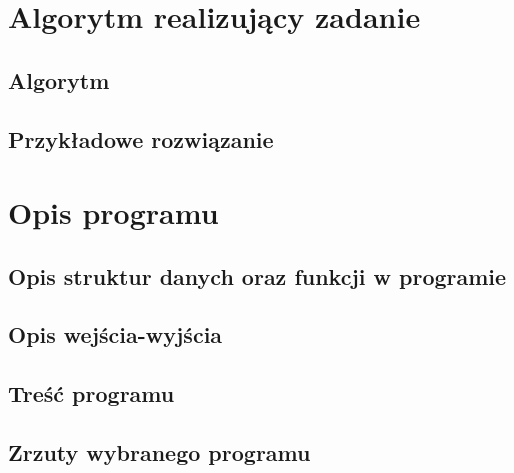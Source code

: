 \documentclass[11pt]{article} %
\begin{document}
\section{Algorytm realizujący zadanie}
\subsection{Algorytm}
\subsection{Przykładowe rozwiązanie}
\section{Opis programu}
\subsection{Opis struktur danych oraz funkcji w programie}
\subsection{Opis wejścia-wyjścia}
\subsection{Treść programu}
\subsection{Zrzuty wybranego programu}
\end{document}
